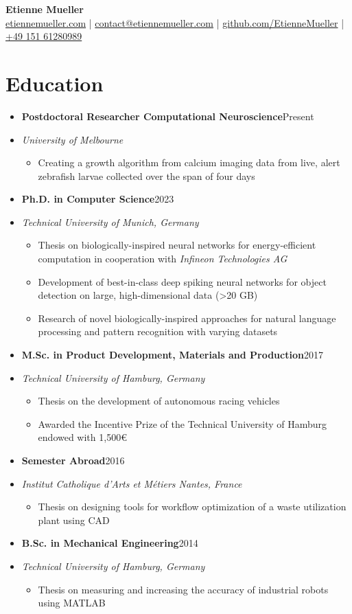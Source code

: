 \documentclass[a4paper,11pt]{article}
\newcommand{\entryBf}[2]{\item \textbf{#1}\hfill #2\vspace{-9pt}}
\newcommand{\entryIt}[1]{\item \textit{\small #1}\vspace{-7pt}}
\newcommand{\cvItemizeBegin}{\begin{itemize}[rightmargin=75pt]}
\newcommand{\cvItemizeEnd}{\end{itemize} \vspace{-7pt}}
\newcommand{\cvItem}[1]{\item[--] \small #1\vspace{-2pt}}
\begin{document}
\begin{center}
    \textbf{\Huge Etienne Mueller} \\ 
    \vspace{12pt}
    \small
    \faHome \hspace{.5pt} 
    \href{https://www.etiennemueller.com}{etiennemueller.com} |
    \faEnvelope \hspace{.5pt} 
    \href{mailto:contact@etiennemueller.com}{contact@etiennemueller.com} |
    \faGithub \hspace{.5pt} 
    \href{https://github.com/EtienneMueller/}{github.com/EtienneMueller} |
    \faPhone \hspace{.5pt} 
    \href{tel:+4915161280989}{+49 151 61280989}
\end{center}

\section{Education}
\begin{itemize}
    
    \entryBf{Postdoctoral Researcher Computational Neuroscience}{Present}
    \entryIt{University of Melbourne}
    \cvItemizeBegin
        \cvItem{Creating a growth algorithm from calcium imaging data from live, alert zebrafish larvae collected over the span of four days}
    \cvItemizeEnd

    \entryBf{Ph.D. in Computer Science}{2023}
    \entryIt{Technical University of Munich, Germany}{}
    \cvItemizeBegin
        \cvItem{Thesis on biologically-inspired neural networks for energy-efficient computation in cooperation with \textit{Infineon Technologies AG}}
        \cvItem{Development of best-in-class deep spiking neural networks for object detection on large, high-dimensional data (>20 GB)}
        \cvItem{Research of novel biologically-inspired approaches for natural language processing and pattern recognition with varying datasets}
    \cvItemizeEnd
    
    \entryBf{M.Sc. in Product Development, Materials and Production}{2017}
    \entryIt{Technical University of Hamburg, Germany}
    \cvItemizeBegin
        \cvItem{Thesis on the development of autonomous racing vehicles}
        \cvItem{Awarded the Incentive Prize of the Technical University of Hamburg endowed with 1,500\euro}
    \cvItemizeEnd
    
    \entryBf{Semester Abroad}{2016}
    \entryIt{Institut Catholique d'Arts et M\'etiers Nantes, France}
    \cvItemizeBegin
        \cvItem{Thesis on designing tools for workflow optimization of a waste utilization plant using CAD}
    \cvItemizeEnd
    
    \entryBf{B.Sc. in Mechanical Engineering}{2014}
    \entryIt{Technical University of Hamburg, Germany}
    \cvItemizeBegin
        \cvItem{Thesis on measuring and increasing the accuracy of industrial robots using MATLAB}
    \cvItemizeEnd
\end{itemize}
\end{document}
